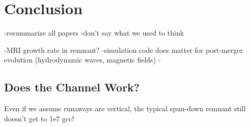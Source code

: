 \chapter{Conclusion}

-resummarize all papers
-don't say what we used to think

-MRI growth rate in remnant?
-simulation code does matter for post-merger evolution (hydrodynamic waves, magnetic fields)
-

\section{Does the \citeal{vkercj10} Channel Work?}

Even if we assume runaways are vertical, the typical spun-down remnant still doesn't get to 1e7 gcc!


